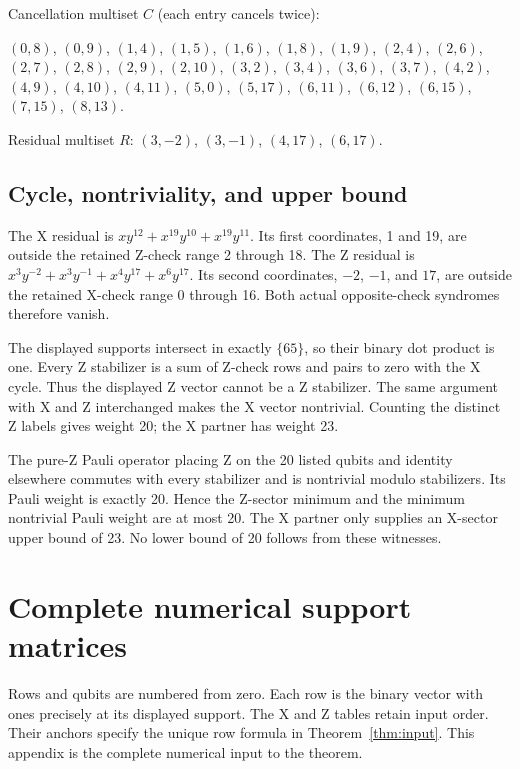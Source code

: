 \documentclass{article}
\begin{document}
Cancellation multiset \(C\) (each entry cancels twice):

\((0, 8)\), \((0, 9)\), \((1, 4)\), \((1, 5)\), \((1, 6)\), \((1, 8)\), \((1, 9)\), \((2, 4)\),
\((2, 6)\), \((2, 7)\), \((2, 8)\), \((2, 9)\), \((2, 10)\), \((3, 2)\), \((3, 4)\), \((3, 6)\),
\((3, 7)\), \((4, 2)\), \((4, 9)\), \((4, 10)\), \((4, 11)\), \((5, 0)\), \((5, 17)\),
\((6, 11)\), \((6, 12)\), \((6, 15)\), \((7, 15)\), \((8, 13)\).

Residual multiset \(R\): \((3, -2)\), \((3, -1)\), \((4, 17)\), \((6, 17)\).

\subsection{Cycle, nontriviality, and upper bound}\label{app:witness-upper}

The X residual is \(x y^{12} + x^{19} y^{10} + x^{19} y^{11}\). Its first coordinates,
1 and 19, are outside the retained Z-check range 2 through 18.
The Z residual is \(x^3 y^{-2} + x^3 y^{-1} + x^4 y^{17} + x^6 y^{17}\).
Its second coordinates, \(-2\), \(-1\), and \(17\), are outside the retained X-check
range 0 through 16. Both actual opposite-check syndromes therefore vanish.

The displayed supports intersect in exactly \(\{65\}\), so their binary dot
product is one. Every Z stabilizer is a sum of Z-check rows and pairs to
zero with the X cycle. Thus the displayed Z vector cannot be a Z stabilizer.
The same argument with X and Z interchanged makes the X vector nontrivial.
Counting the distinct Z labels gives weight 20; the X partner has weight 23.

The pure-Z Pauli operator placing Z on the 20 listed qubits and identity
elsewhere commutes with every stabilizer and is nontrivial modulo stabilizers.
Its Pauli weight is exactly 20. Hence the Z-sector minimum and the minimum
nontrivial Pauli weight are at most 20. The X partner only supplies an
X-sector upper bound of 23. No lower bound of 20 follows from these witnesses.

\section{Complete numerical support matrices}\label{app:tables}

Rows and qubits are numbered from zero. Each row is the binary vector with
ones precisely at its displayed support. The X and Z tables retain input order.
Their anchors specify the unique row formula in Theorem~\ref{thm:input}. This appendix is
the complete numerical input to the theorem.
\end{document}
